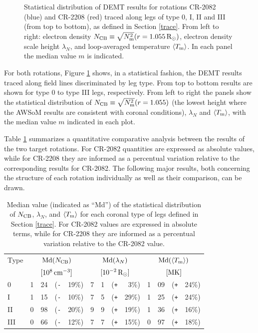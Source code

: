 \documentclass[namedreferences]{solarphysics}
\newcommand{\mrsun}{{\rm R_\odot}}
\newcommand{\med}{{\rm Md}}
\newcommand{\avgTe}{\left<\Tm\right>}
\newcommand{\MK}{{\rm MK}}
\newcommand{\lN}{\lambda_N}
\newcommand{\NCB}{N_{\rm CB}}
\newcommand{\Tm}{T_{\rm m}}
\newcommand{\aTm}{\left<\Tm\right>}
\newcommand{\Nsqm}{N^2_{{\rm m}}}
\newcommand{\sqravgN}{\sqrt{\Nsqm}}
\newcommand{\Pl}{\texttt{+}}
\newcommand{\Mi}{\texttt{-}}
\begin{document}
\begin{article}
\begin{figure}[h!]
\begin{center}
\caption{{Statistical distribution of {DEMT results for rotations CR-2082 (blue) and CR-2208 (red)} traced along legs of type 0, I, II and III (from top to bottom), as defined in Section \ref{trace}. From left to right: {electron density $\NCB\equiv\sqravgN(r=1.055\,\mrsun)$,} electron density scale height $\lN$, {and loop-averaged temperature $\aTm$. In each panel} the median value $m$ is indicated.} }
\label{histos_fulldemt}
\end{center}
\end{figure} 

{For both rotations, Figure \ref{histos_fulldemt} shows, in a statistical fashion, the DEMT results traced along field lines discriminated by leg type}. From top to bottom {results are shown for} type 0 to type III {legs}{, respectively}. From left to right the panels show the statistical distribution of $\NCB \equiv \sqravgN(r=1.055)$ {(the lowest height where the AWSoM results are consistent with coronal conditions)}, $\lN$ {and} $\aTm$, {with the median value $m$ indicated in each plot}.

{Table \ref{tabla_demt} summarizes a} quantitative comparative analysis between the results of the two {target rotations}. For CR-2082 quantities are expressed as absolute values, {while} for CR-2208 they are informed {as a percentual variation} relative to the corresponding results for CR-2082. {The following major results, both concerning the structure of each rotation individually as well as their comparison, can be drawn.}

\begin{table}[h!]
\begin{tabular}{l r@{.}l@{\hskip 0.05in} r@{\hskip 0.01in} r  r@{.}l@{\hskip 0.05in} r@{\hskip 0.01in} r r@{.}l@{\hskip 0.05in} r@{\hskip 0.01in} r }
\hline
Type    & \multicolumn{4}{c}{$\med(\NCB)$}             & \multicolumn{4}{c}{$\med(\lN)$} & \multicolumn{4}{c}{$\med(\avgTe)$} \\
        & \multicolumn{4}{c}{$[10^8\,{\rm cm}^{-3}]$}  & \multicolumn{4}{c}{$[{\rm 10}^{-2}\,\mrsun]$} & \multicolumn{4}{c}{$[\MK]$} \\
\hline
0    & 1&24 &(\Mi&19\%)  &   7&1 &(\Pl&~3\%) &   1&09 &(\Pl&24\%) \\
I    & 1&15 &(\Mi&10\%)  &   7&5 &(\Pl&29\%) &   1&25 &(\Pl&24\%) \\
II   & 0&98 &(\Mi&20\%)  &   9&9 &(\Pl&19\%) &   1&36 &(\Pl&16\%) \\
III  & 0&66 &(\Mi&12\%)  &   7&7 &(\Pl&15\%) &   0&97 &(\Pl&18\%) \\
\hline          
\end{tabular}
\caption{Median value (indicated as ``Md'') of the statistical distribution of $\NCB$, $\lN$, and $\aTm$ for each coronal type of legs defined in Section \ref{trace}. For CR-2082 values are expressed in absolute terms, while for CR-2208 they are informed as a percentual variation relative to the CR-2082 value.}
\label{tabla_demt}
\end{table}


\end{article}
\end{document}
